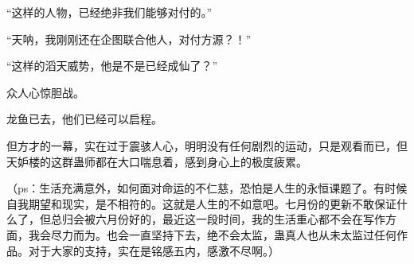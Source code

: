 \begin{this_body}
“这样的人物，已经绝非我们能够对付的。”

“天呐，我刚刚还在企图联合他人，对付方源？！”

“这样的滔天威势，他是不是已经成仙了？”

众人心惊胆战。

龙鱼已去，他们已经可以启程。

但方才的一幕，实在过于震骇人心，明明没有任何剧烈的运动，只是观看而已，但天妒楼的这群蛊师都在大口喘息着，感到身心上的极度疲累。

（ps：生活充满意外，如何面对命运的不仁慈，恐怕是人生的永恒课题了。有时候自我期望和现实，是不相符的。这就是人生的不如意吧。七月份的更新不敢保证什么了，但总归会被六月份好的，最近这一段时间，我的生活重心都不会在写作方面，我会尽力而为。也会一直坚持下去，绝不会太监，蛊真人也从未太监过任何作品。对于大家的支持，实在是铭感五内，感激不尽啊。）

\end{this_body}

